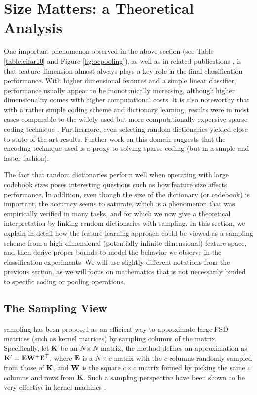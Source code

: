 \section{Size Matters: a Theoretical Analysis}

One important phenomenon observed in the above section (see \eg Table \ref{table:cifar10} and Figure \ref{fig:ocpooling}), as well as in related publications \cite{coates2010analysis,coates2011icml}, is that feature dimension almost always plays a key role in the final classification performance. With higher dimensional features and a simple linear classifier, performance usually appear to be monotonically increasing, although higher dimensionality comes with higher computational costs. It is also noteworthy that with a rather simple coding scheme and dictionary learning, results were in most cases comparable to the widely used but more computationally expensive sparse coding technique \cite{coates2011icml}. Furthermore, even selecting random dictionaries yielded close to state-of-the-art results. Further work on this domain \cite{freitas} suggests that the encoding technique used is a proxy to solving sparse coding (but in a simple and faster fashion).

The fact that random dictionaries perform well when operating with large codebook sizes poses interesting questions such as how feature size affects performance. In addition, even though the size of the dictionary (or codebook) is important, the accuracy seems to saturate, which is a phenomenon that was empirically verified in many tasks, and for which we now give a theoretical interpretation by linking random dictionaries with \nystrom sampling. In this section, we explain in detail how the feature learning approach could be viewed as a \nystrom sampling scheme from a high-dimensional (potentially infinite dimensional) feature space, and then derive proper bounds to model the behavior we observe in the classification experiments. We will use slightly different notations from the previous section, as we will focus on mathematics that is not necessarily binded to specific coding or pooling operations.

\subsection{The \nystrom Sampling View}
\nystrom sampling has been proposed as an efficient way to approximate large PSD matrices (such as kernel matrices) by sampling columns of the matrix. Specifically, let $\mathbf{K}$ be an $N\times N$ matrix, the \nystrom method defines an approximation as $\mathbf{K}' = \mathbf{E}\mathbf{W}^{+}\mathbf{E}^\top$, where $\mathbf{E}$ is a $N\times c$ matrix with the $c$ columns randomly sampled from those of $\mathbf{K}$, and $\mathbf{W}$ is the square $c\times c$ matrix formed by picking the same $c$ columns and rows from $\mathbf{K}$. Such a sampling perspective have been shown to be very effective in kernel machines \cite{zhang2008improved,cortes10,kumar2012sampling}.

